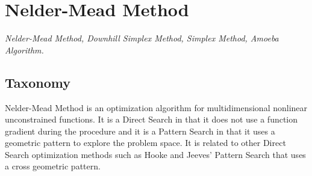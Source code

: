 
\section{Nelder-Mead Method} 
\label{sec:neldermead}

\emph{Nelder-Mead Method, Downhill Simplex Method, Simplex Method, Amoeba Algorithm.}

\subsection{Taxonomy}
Nelder-Mead Method is an optimization algorithm for multidimensional nonlinear unconstrained functions.
It is a Direct Search in that it does not use a function gradient during the procedure and it is a Pattern Search in that it uses a geometric pattern to explore the problem space.
It is related to other Direct Search optimization methods such as Hooke and Jeeves' Pattern Search that uses a cross geometric pattern.

